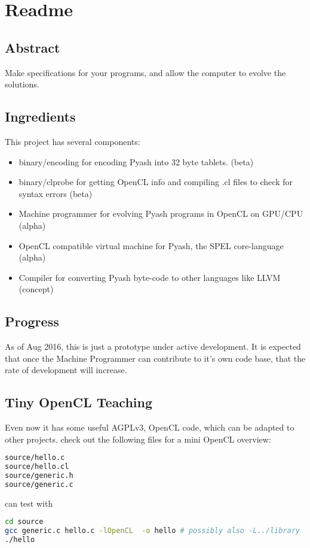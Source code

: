 \documentclass[12pt]{report}
\begin{document}
\chapter{Readme}
\section{Abstract}
Make specifications for your programs, and allow the computer to evolve the
solutions. 

\section{Ingredients}
This project has several components:

\begin{itemize}
\item binary/encoding for encoding Pyash into 32 byte tablets. (beta)
\item binary/clprobe for getting OpenCL info and compiling .cl files to check
for syntax errors (beta)
\item Machine programmer for evolving Pyash programs in OpenCL on GPU/CPU  (alpha)
\item OpenCL compatible virtual machine for Pyash, the SPEL core-language (alpha)
\item Compiler for converting Pyash byte-code to other languages like LLVM (concept)
\end{itemize}

\section{Progress}
As of Aug 2016, this is just a prototype under active development. 
It is expected that once the Machine Programmer can contribute to it's own code
base, that the rate of development will increase. 

\section{Tiny OpenCL Teaching}
Even now it has some useful AGPLv3, OpenCL code, which can be adapted to
other projects. 
check out the following files for a mini OpenCL overview:
\begin{lstlisting}[language=bash]
source/hello.c
source/hello.cl
source/generic.h
source/generic.c
\end{lstlisting}

can test with
\begin{lstlisting}[language=bash]
cd source
gcc generic.c hello.c -lOpenCL  -o hello # possibly also -L../library 
./hello
\end{lstlisting}
\end{document}
